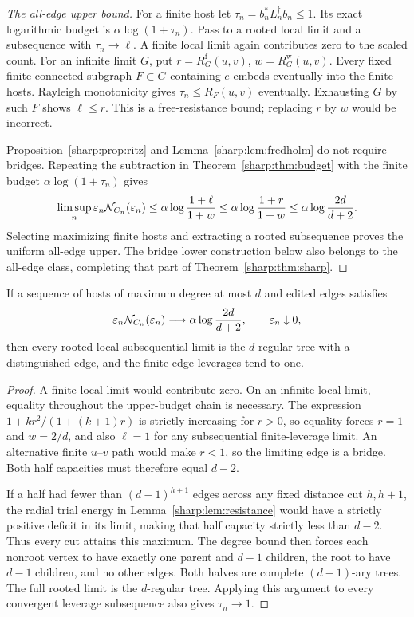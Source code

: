 \begin{proof}[The all-edge upper bound]
For a finite host let $\tau_n=b_n^*L_n^\dagger b_n\le1$. Its exact
logarithmic budget is $\alpha\log(1+\tau_n)$. Pass to a rooted local
limit and a subsequence with $\tau_n\to\ell$. A finite local limit
again contributes zero to the scaled count. For an infinite limit $G$,
put $r=R_G^{\mathrm f}(u,v)$, $w=R_G^{\mathrm w}(u,v)$.
Every fixed finite connected subgraph $F\subset G$ containing $e$
embeds eventually into the finite hosts. Rayleigh monotonicity gives
$\tau_n\le R_F(u,v)$ eventually. Exhausting $G$ by such $F$ shows
$\ell\le r$. This is a free-resistance bound; replacing $r$ by $w$
would be incorrect.

Proposition~\ref{sharp:prop:ritz} and Lemma~\ref{sharp:lem:fredholm} do not require
bridges. Repeating the subtraction in Theorem~\ref{sharp:thm:budget} with the
finite budget $\alpha\log(1+\tau_n)$ gives
\[
 \limsup_n\varepsilon_n\mathcal N_{C_n}(\varepsilon_n)
 \le\alpha\log\frac{1+\ell}{1+w}
 \le\alpha\log\frac{1+r}{1+w}
 \le\alpha\log\frac{2d}{d+2}.
\]
Selecting maximizing finite hosts and extracting a rooted subsequence
proves the uniform all-edge upper. The bridge lower construction below
also belongs to the all-edge class, completing that part of
Theorem~\ref{sharp:thm:sharp}.
\end{proof}

\begin{proposition}\label{sharp:prop:rigidity}
If a sequence of hosts of maximum degree at most $d$ and edited edges satisfies
\[
 \varepsilon_n\mathcal N_{C_n}(\varepsilon_n)
       \longrightarrow\alpha\log\frac{2d}{d+2},\qquad
                         \varepsilon_n\downarrow0,
\]
then every rooted local subsequential limit is the $d$-regular tree
with a distinguished edge, and the finite edge leverages tend to one.
\end{proposition}
\begin{proof}
A finite local limit would contribute zero. On an infinite local
limit, equality throughout the upper-budget chain is necessary.
The expression $1+kr^2/(1+(k+1)r)$ is strictly increasing for $r>0$,
so equality forces $r=1$ and $w=2/d$, and also $\ell=1$ for any
subsequential finite-leverage limit. An alternative finite $u$--$v$
path would make $r<1$, so the limiting edge is a bridge.
Both half capacities must therefore equal $d-2$.

If a half had fewer than $(d-1)^{h+1}$ edges across any fixed distance
cut $h,h+1$, the radial trial energy in Lemma~\ref{sharp:lem:resistance}
would have a strictly positive deficit in its limit, making that half
capacity strictly less than $d-2$. Thus every cut attains this maximum.
The degree bound then forces each nonroot vertex to have exactly one
parent and $d-1$ children, the root to have $d-1$ children, and no
other edges. Both halves are complete $(d-1)$-ary trees. The full
rooted limit is the $d$-regular tree. Applying this argument to every
convergent leverage subsequence also gives $\tau_n\to1$.
\end{proof}

